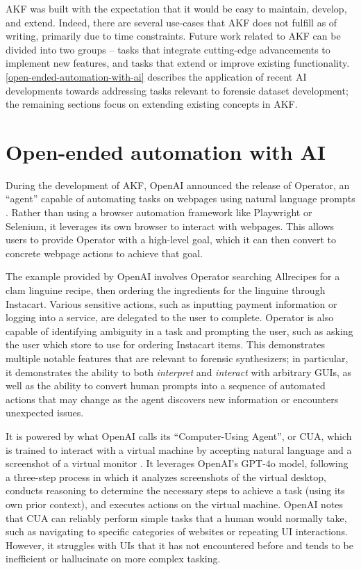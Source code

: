AKF was built with the expectation that it would be easy to maintain,
develop, and extend. Indeed, there are several use-cases that AKF does
not fulfill as of writing, primarily due to time constraints. Future
work related to AKF can be divided into two groups -- tasks that
integrate cutting-edge advancements to implement new features, and tasks
that extend or improve existing functionality. \autoref{open-ended-automation-with-ai} describes the application of recent AI
developments towards addressing tasks relevant to forensic dataset
development; the remaining sections focus on extending existing concepts
in AKF.

\section{Open-ended automation with
AI}\label{open-ended-automation-with-ai}

During the development of AKF, OpenAI announced the release of Operator,
an ``agent'' capable of automating tasks on webpages using natural
language prompts \cite{openaiIntroducingOperator2025}. Rather than
using a browser automation framework like Playwright or Selenium, it
leverages its own browser to interact with webpages. This allows users
to provide Operator with a high-level goal, which it can then convert to
concrete webpage actions to achieve that goal.

The example provided by OpenAI involves Operator searching Allrecipes
for a clam linguine recipe, then ordering the ingredients for the
linguine through Instacart. Various sensitive actions, such as inputting
payment information or logging into a service, are delegated to the user
to complete. Operator is also capable of identifying ambiguity in a task
and prompting the user, such as asking the user which store to use for
ordering Instacart items. This demonstrates multiple notable features
that are relevant to forensic synthesizers; in particular, it
demonstrates the ability to both \emph{interpret} and \emph{interact}
with arbitrary GUIs, as well as the ability to convert human prompts
into a sequence of automated actions that may change as the agent
discovers new information or encounters unexpected issues.

It is powered by what OpenAI calls its ``Computer-Using Agent'', or CUA,
which is trained to interact with a virtual machine by accepting natural
language and a screenshot of a virtual monitor
\cite{openaiComputerUsingAgent2025}. It leverages OpenAI's GPT-4o
model, following a three-step process in which it analyzes screenshots
of the virtual desktop, conducts reasoning to determine the necessary
steps to achieve a task (using its own prior context), and executes
actions on the virtual machine. OpenAI notes that CUA can reliably
perform simple tasks that a human would normally take, such as
navigating to specific categories of websites or repeating UI
interactions. However, it struggles with UIs that it has not encountered
before and tends to be inefficient or hallucinate on more complex
tasking.

